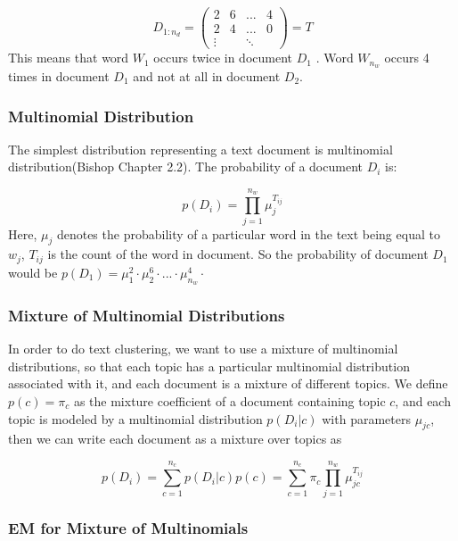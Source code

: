 \documentclass[twoside,10pt]{article}
\begin{document}
\begin{equation}
D_{1:n_d} =  \begin{pmatrix} 2&6&...&4\\ 2 & 4&...&0\\\vdots&
&\ddots \end{pmatrix} = T\nonumber
\end{equation}
This means that word $W_1$ occurs twice in document $D_1$ . Word
$W_{n_w}$ occurs 4 times in document $D_1$ and not at all in
document $D_2$.

\subsubsection*{Multinomial Distribution}

The simplest distribution representing a text document is
multinomial distribution(Bishop Chapter 2.2). The probability of a
document $D_i$ is:

\begin{equation}
p(D_i) = \prod_{j=1}^{n_w} \mu_j^{T_{ij}}\nonumber
\end{equation}
Here, $\mu_j$ denotes the probability of a particular word in the
text being equal to $w_j$, $T_{ij}$ is the count of the word in
document. So the probability of document $D_1$ would be $p(D_1)=
\mu_1^2\cdot\mu_2^6\cdot...\cdot\mu_{n_w}^4\cdot$

\subsubsection*{Mixture of Multinomial Distributions}

In order to do text clustering, we want to use a mixture of
multinomial distributions, so that each topic has a particular
multinomial distribution associated with it, and each document is a
mixture of different topics. We define $p(c) = \pi_c $  as the
mixture coefficient of a document containing topic $c$, and each topic
is modeled by a multinomial distribution $p(D_i|c)$ with parameters
$\mu_{jc}$, then we can write each document as a mixture over topics
as


\begin{equation}
p(D_i) = \sum_{c=1}^{n_c} p(D_i|c)p(c) = \sum_{c=1}^{n_c} \pi_c
\prod_{j=1}^{n_w} \mu_{jc}^{T_{ij}}\nonumber
\end{equation}

\subsubsection*{EM for Mixture of Multinomials}
\end{document}
